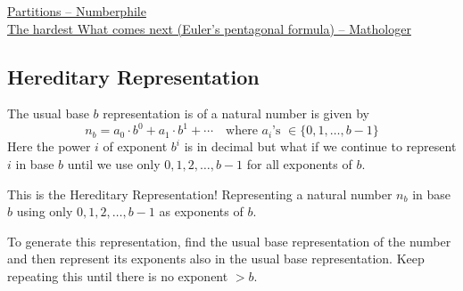 \begin{funvideo}
\href{https://youtu.be/NjCIq58rZ8I}{Partitions -- Numberphile}\\
\href{https://youtu.be/iJ8pnCO0nTY}{The hardest What comes next (Euler's pentagonal formula) -- Mathologer}
\end{funvideo}
\recalctypearea
\subsection{Hereditary Representation}
The usual base $b$ representation is of a natural number is given by
\begin{equation}
 	n_b = a_0 \cdot b^0 + a_1 \cdot b^1 + \cdots \quad\text{where $a_i$'s $\in \{0,1,\ldots,b-1\}$}
\end{equation} Here the power $i$ of exponent $b^i$ is in decimal but what if we continue to represent $i$ in base $b$ until we use only $0, 1, 2, \ldots, b-1$ for all exponents of $b$.

This is the Hereditary Representation! Representing a natural number $n_b$ in base $b$ using only $0, 1, 2, \ldots, b-1$ as exponents of $b$.

To generate this representation, find the usual base representation of the number and then represent its exponents also in the usual base representation. Keep repeating this until there is no exponent $> b$.

